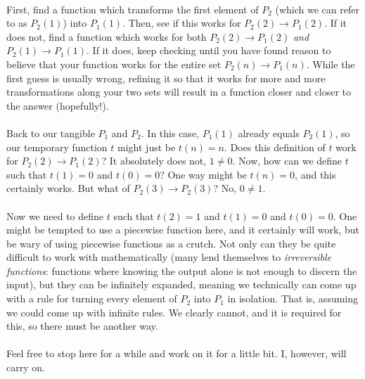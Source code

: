 \documentclass[12pt,letterpaper]{article}
\begin{document}
			\paragraph{} First, find a function which transforms the first element of $P_2$ (which we can refer to as $P_2(1)$) into $P_1(1)$. Then, see if this works for $P_2(2) \rightarrow P_1(2)$. If it does not, find a function which works for both $P_2(2) \rightarrow P_1(2)$ \textit{and} $P_2(1) \rightarrow P_1(1)$. If it does, keep checking until you have found reason to believe that your function works for the entire set $P_2(n) \rightarrow P_1(n)$. While the first guess is usually wrong, refining it so that it works for more and more transformations along your two sets will result in a function closer and closer to the answer (hopefully!).
			
			\paragraph{} Back to our tangible $P_1$ and $P_2$. In this case, $P_1(1)$ already equals $P_2(1)$, so our temporary function $t$ might just be $t(n) = n$. Does this definition of $t$ work for $P_2(2) \rightarrow P_1(2)$? It absolutely does not, $1 \neq 0$. Now, how can we define $t$ such that $t(1) = 0$ and $t(0) = 0$? One way might be $t(n) = 0$, and this certainly works. But what of $P_2(3) \rightarrow P_2(3)$? No, $0 \neq 1$.
			
			\paragraph{} Now we need to define $t$ such that $t(2) = 1$ and $t(1) = 0$ and $t(0) = 0$. One might be tempted to use a piecewise function here, and it certainly will work, but be wary of using piecewise functions as a crutch. Not only can they be quite difficult to work with mathematically (many lend themselves to \textit{irreversible functions}: functions where knowing the output alone is not enough to discern the input), but they can be infinitely expanded, meaning we technically can come up with a rule for turning every element of $P_2$ into $P_1$ in isolation. That is, assuming we could come up with infinite rules. We clearly cannot, and it is required for this, so there must be another way.
			
			\paragraph{} Feel free to stop here for a while and work on it for a little bit. I, however, will carry on.
			
\end{document}
